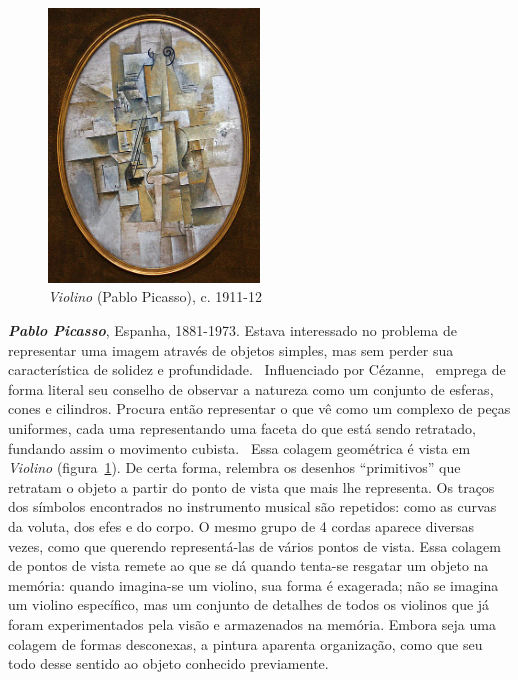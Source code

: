 \begin{figure}
  \vspace{-15pt}
  \begin{centering}
    \caption{\emph{Violino} (Pablo Picasso), c. 1911-12}
    \label{fig:picasso:violino}
    \includegraphics[width=0.5\textwidth]{figs/picasso_violino.png}
  \end{centering}
\end{figure}

\textbf{\emph{Pablo Picasso}}, Espanha, 1881-1973. Estava interessado
no problema de representar uma imagem através de objetos simples, mas
sem perder sua característica de solidez e
profundidade.~\cite{daix,gombrich} Influenciado por
Cézanne,~\cite{rishel} emprega de forma literal seu conselho de
observar a natureza como um conjunto de esferas, cones e
cilindros. Procura então representar o que vê como um complexo de
peças uniformes, cada uma representando uma faceta do que está sendo
retratado, fundando assim o movimento cubista.~\cite{barr,golding}
Essa colagem geométrica é vista em \emph{Violino}
(figura~\ref{fig:picasso:violino}). De certa forma, relembra os
desenhos ``primitivos'' que retratam o objeto a partir do ponto de
vista que mais lhe representa. Os traços dos símbolos encontrados no
instrumento musical são repetidos: como as curvas da voluta, dos efes
e do corpo. O mesmo grupo de 4 cordas aparece diversas vezes, como que
querendo representá-las de vários pontos de vista. Essa colagem de
pontos de vista remete ao que se dá quando tenta-se resgatar um objeto
na memória: quando imagina-se um violino, sua forma é exagerada; não
se imagina um violino específico, mas um conjunto de detalhes de todos
os violinos que já foram experimentados pela visão e armazenados na
memória. Embora seja uma colagem de formas desconexas, a pintura
aparenta organização, como que seu todo desse sentido ao objeto
conhecido previamente.~\cite{gombrich}

